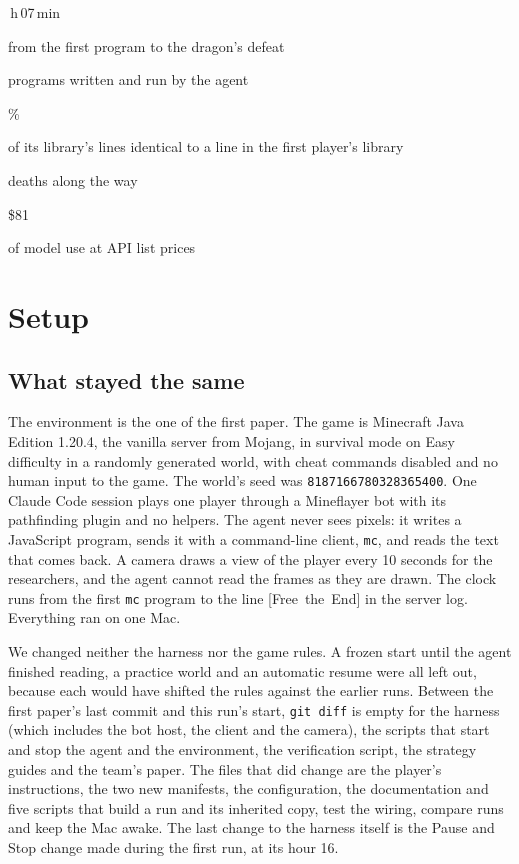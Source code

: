 \documentclass[11pt,a4paper]{article}
\newcommand{\statcell}[2]{%
  \begin{minipage}[t]{0.177\textwidth}\raggedright
    {\sffamily\fontsize{17}{20}\selectfont #1\par}\vspace{3pt}
    {\sffamily\fontsize{7}{8.6}\selectfont\color{inkgrey}#2\par}
  \end{minipage}}
\newcommand{\statsep}{\hspace{0.5em}{\color{rulegrey}\vrule width 0.6pt}\hspace{0.6em}}
\newcommand{\adv}[1]{\mbox{\textsf{[#1]}}}
\begin{document}
\vspace{10pt}
\noindent\statcell{9\,h\,07\,min}{from the first program to the dragon's defeat}%
\statsep\statcell{780}{programs written and run by the agent}%
\statsep\statcell{81\%}{of its library's lines identical to a line in the first player's library}%
\statsep\statcell{16}{deaths along the way}%
\statsep\statcell{\$81}{of model use at API list prices}
\vspace{6pt}

\section{Setup}
\label{sec:setup}

\subsection{What stayed the same}

The environment is the one of the first paper. The game is Minecraft Java Edition 1.20.4, the vanilla server from Mojang, in survival mode on Easy difficulty in a randomly generated world, with cheat commands disabled and no human input to the game. The world's seed was \mbox{\texttt{8187166780328365400}}. One Claude Code session \citep{claudecode} plays one player through a Mineflayer bot \citep{mineflayer} with its pathfinding plugin and no helpers. The agent never sees pixels: it writes a JavaScript program, sends it with a command-line client, \texttt{mc}, and reads the text that comes back. A camera draws a view of the player every 10 seconds for the researchers, and the agent cannot read the frames as they are drawn. The clock runs from the first \texttt{mc} program to the line \adv{Free the End} in the server log. Everything ran on one Mac.

We changed neither the harness nor the game rules. A frozen start until the agent finished reading, a practice world and an automatic resume were all left out, because each would have shifted the rules against the earlier runs. Between the first paper's last commit and this run's start, \texttt{git diff} is empty for the harness (which includes the bot host, the client and the camera), the scripts that start and stop the agent and the environment, the verification script, the strategy guides and the team's paper. The files that did change are the player's instructions, the two new manifests, the configuration, the documentation and five scripts that build a run and its inherited copy, test the wiring, compare runs and keep the Mac awake. The last change to the harness itself is the Pause and Stop change made during the first run, at its hour 16.
\end{document}
